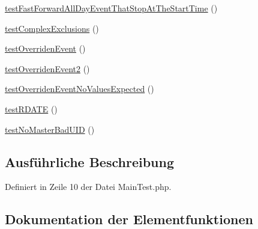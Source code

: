 \begin{DoxyCompactItemize}
\mbox{\hyperlink{class_sabre_1_1_v_object_1_1_recur_1_1_event_iterator_1_1_main_test_a59b2b00d13f20686e931660801c29b10}{test\+Fast\+Forward\+All\+Day\+Event\+That\+Stop\+At\+The\+Start\+Time}} ()
\item 
\mbox{\hyperlink{class_sabre_1_1_v_object_1_1_recur_1_1_event_iterator_1_1_main_test_aecf8a77afa4c63630a57286f21c272ee}{test\+Complex\+Exclusions}} ()
\item 
\mbox{\hyperlink{class_sabre_1_1_v_object_1_1_recur_1_1_event_iterator_1_1_main_test_a50f5f7b99290efb0997e2214b14c7bf9}{test\+Overriden\+Event}} ()
\item 
\mbox{\hyperlink{class_sabre_1_1_v_object_1_1_recur_1_1_event_iterator_1_1_main_test_adf1cd0316a2db006ff8f77b3c3460e84}{test\+Overriden\+Event2}} ()
\item 
\mbox{\hyperlink{class_sabre_1_1_v_object_1_1_recur_1_1_event_iterator_1_1_main_test_a7aa8fe6c44331cc8c78a98afbb89bb4a}{test\+Overriden\+Event\+No\+Values\+Expected}} ()
\item 
\mbox{\hyperlink{class_sabre_1_1_v_object_1_1_recur_1_1_event_iterator_1_1_main_test_a973e8ac3f6ff2f35b7ed9a9ec0bf2239}{test\+R\+D\+A\+TE}} ()
\item 
\mbox{\hyperlink{class_sabre_1_1_v_object_1_1_recur_1_1_event_iterator_1_1_main_test_ab81cda7e0ff6fc0fd34c61ebcce16636}{test\+No\+Master\+Bad\+U\+ID}} ()
\end{DoxyCompactItemize}


\subsection{Ausführliche Beschreibung}


Definiert in Zeile 10 der Datei Main\+Test.\+php.



\subsection{Dokumentation der Elementfunktionen}
\mbox{\label{class_sabre_1_1_v_object_1_1_recur_1_1_event_iterator_1_1_main_test_aecf8a77afa4c63630a57286f21c272ee}} 
